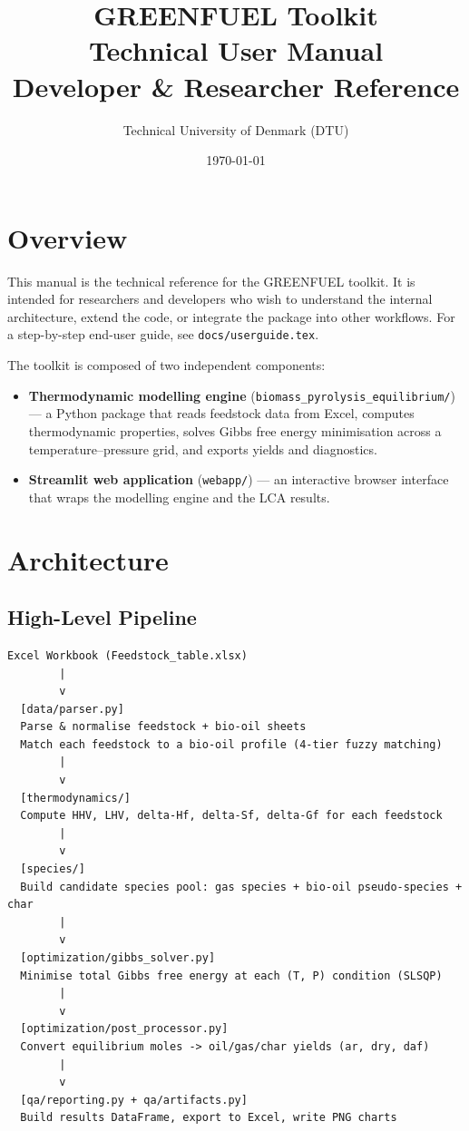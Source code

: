 \documentclass[12pt, a4paper]{article}
\title{%
    \textbf{GREENFUEL Toolkit}\\[0.5em]
    \large Technical User Manual\\[0.3em]
    \normalsize Developer \& Researcher Reference
}
\author{Technical University of Denmark (DTU)}
\date{\today}
\begin{document}
\maketitle
\tableofcontents
\newpage

\section{Overview}

This manual is the technical reference for the GREENFUEL toolkit. It is intended for researchers and developers who wish to understand the internal architecture, extend the code, or integrate the package into other workflows. For a step-by-step end-user guide, see \texttt{docs/userguide.tex}.

The toolkit is composed of two independent components:

\begin{itemize}
    \item \textbf{Thermodynamic modelling engine} (\texttt{biomass\_pyrolysis\_equilibrium/}) — a Python package that reads feedstock data from Excel, computes thermodynamic properties, solves Gibbs free energy minimisation across a temperature--pressure grid, and exports yields and diagnostics.
    \item \textbf{Streamlit web application} (\texttt{webapp/}) — an interactive browser interface that wraps the modelling engine and the LCA results.
\end{itemize}

\section{Architecture}

\subsection{High-Level Pipeline}

\begin{verbatim}
Excel Workbook (Feedstock_table.xlsx)
        |
        v
  [data/parser.py]
  Parse & normalise feedstock + bio-oil sheets
  Match each feedstock to a bio-oil profile (4-tier fuzzy matching)
        |
        v
  [thermodynamics/]
  Compute HHV, LHV, delta-Hf, delta-Sf, delta-Gf for each feedstock
        |
        v
  [species/]
  Build candidate species pool: gas species + bio-oil pseudo-species + char
        |
        v
  [optimization/gibbs_solver.py]
  Minimise total Gibbs free energy at each (T, P) condition (SLSQP)
        |
        v
  [optimization/post_processor.py]
  Convert equilibrium moles -> oil/gas/char yields (ar, dry, daf)
        |
        v
  [qa/reporting.py + qa/artifacts.py]
  Build results DataFrame, export to Excel, write PNG charts
\end{verbatim}
\end{document}

